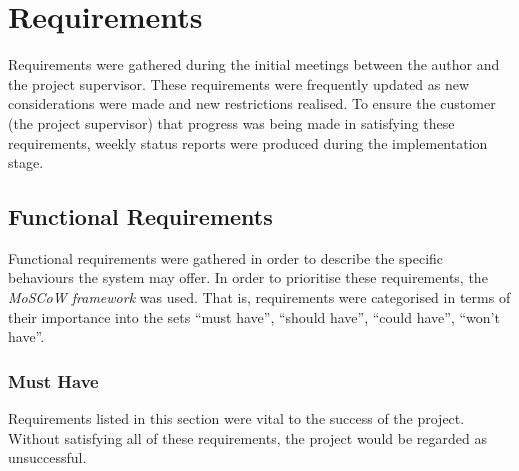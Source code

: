 \documentclass{l4proj}
\begin{document}
\chapter{Requirements}

Requirements were gathered during the initial meetings between the author and the project supervisor. These requirements were frequently updated as new considerations were made and new restrictions realised. To ensure the customer (the project supervisor) that progress was being made in satisfying these requirements, weekly status reports were produced during the implementation stage. 

    \section{Functional Requirements}
    
    Functional requirements were gathered in order to describe the specific behaviours the system may offer. In order to prioritise these requirements, the \textit{MoSCoW framework} was used. That is, requirements were categorised in terms of their importance into the sets ``must have'', ``should have'', ``could have'', ``won't have''.
    
    \subsection{Must Have}
    
    Requirements listed in this section were vital to the success of the project. Without satisfying all of these requirements, the project would be regarded as unsuccessful. 
  
\end{document}
